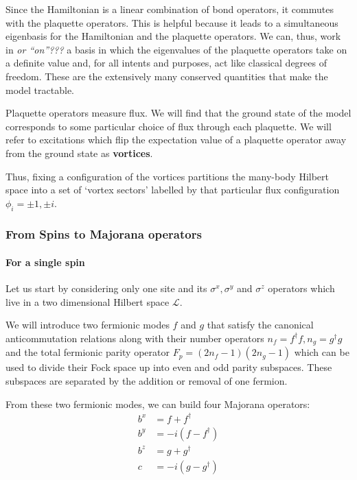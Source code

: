Since the Hamiltonian is a linear combination of bond operators, it commutes with the plaquette operators. This is helpful because it leads to a simultaneous eigenbasis for the Hamiltonian and the plaquette operators. We can, thus, work in \emph{or ``on''???} a basis in which the eigenvalues of the plaquette operators take on a definite value and, for all intents and purposes, act like classical degrees of freedom. These are the extensively many conserved quantities that make the model tractable.

Plaquette operators measure flux. We will find that the ground state of the model corresponds to some particular choice of flux through each plaquette. We will refer to excitations which flip the expectation value of a plaquette operator away from the ground state as \textbf{vortices}.

Thus, fixing a configuration of the vortices partitions the many-body Hilbert space into a set of `vortex sectors' labelled by that particular flux configuration \(\phi_i = \pm 1,\pm i\).

\hypertarget{from-spins-to-majorana-operators}{%
\subsubsection{From Spins to Majorana operators}\label{from-spins-to-majorana-operators}}

\hypertarget{for-a-single-spin}{%
\paragraph{For a single spin}\label{for-a-single-spin}}

Let us start by considering only one site and its \(\sigma^x, \sigma^y\) and \(\sigma^z\) operators which live in a two dimensional Hilbert space \(\mathcal{L}\).

We will introduce two fermionic modes \(f\) and \(g\) that satisfy the canonical anticommutation relations along with their number operators \(n_f = f^\dagger f, n_g = g^\dagger g\) and the total fermionic parity operator \(F_p = (2n_f - 1)(2n_g - 1)\) which can be used to divide their Fock space up into even and odd parity subspaces. These subspaces are separated by the addition or removal of one fermion.

From these two fermionic modes, we can build four Majorana operators: \[\begin{aligned}
b^x &= f + f^\dagger\\
b^y &= -i(f - f^\dagger)\\
b^z &= g + g^\dagger\\
c   &= -i(g - g^\dagger)
\end{aligned}\]

